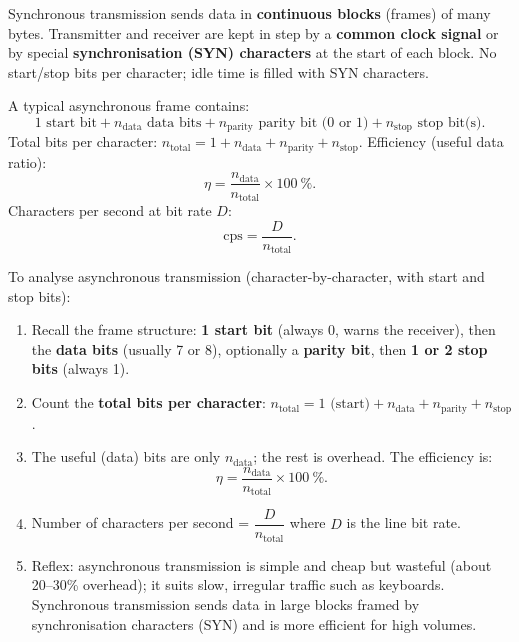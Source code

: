 \documentclass[11pt]{article}
\newcommand{\cle}[1]{{\popxbold\color{popdark}#1}}
\begin{document}
\begin{definition}
\cle{Synchronous transmission} sends data in \textbf{continuous blocks} (frames) of many bytes. Transmitter and receiver are kept in step by a \textbf{common clock signal} or by special \textbf{synchronisation (SYN) characters} at the start of each block. No start/stop bits per character; idle time is filled with SYN characters.
\end{definition}

\begin{propriete}
A typical asynchronous frame contains:
\[ \text{1 start bit} + n_{\text{data}} \text{ data bits} + n_{\text{parity}} \text{ parity bit (0 or 1)} + n_{\text{stop}} \text{ stop bit(s)}. \]
Total bits per character: $n_{\text{total}} = 1 + n_{\text{data}} + n_{\text{parity}} + n_{\text{stop}}$.
Efficiency (useful data ratio):
\[ \eta = \frac{n_{\text{data}}}{n_{\text{total}}} \times 100\ \%. \]
Characters per second at bit rate $D$:
\[ \text{cps} = \frac{D}{n_{\text{total}}}. \]
\end{propriete}

\begin{methode}
To analyse \cle{asynchronous transmission} (character-by-character, with start and stop bits):
\begin{enumerate}
\item Recall the frame structure: \textbf{1 start bit} (always 0, warns the receiver), then the \textbf{data bits} (usually 7 or 8), optionally a \textbf{parity bit}, then \textbf{1 or 2 stop bits} (always 1).
\item Count the \textbf{total bits per character}: $n_{\text{total}} = 1 \text{ (start)} + n_{\text{data}} + n_{\text{parity}} + n_{\text{stop}}$.
\item The useful (data) bits are only $n_{\text{data}}$; the rest is \cle{overhead}. The efficiency is:
\[ \eta = \frac{n_{\text{data}}}{n_{\text{total}}} \times 100\ \%. \]
\item Number of characters per second = $\dfrac{D}{n_{\text{total}}}$ where $D$ is the line bit rate.
\item Reflex: asynchronous transmission is simple and cheap but wasteful (about 20--30\% overhead); it suits slow, irregular traffic such as keyboards. \cle{Synchronous transmission} sends data in large blocks framed by synchronisation characters (SYN) and is more efficient for high volumes.
\end{enumerate}
\end{methode}
\end{document}
